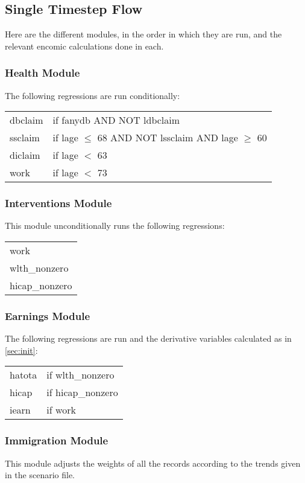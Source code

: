 \documentclass{article}
\begin{document}
\subsection{Single Timestep Flow}
Here are the different modules, in the order in which they are run,
and the relevant encomic calculations done in each.

\subsubsection{Health Module}
The following regressions are run conditionally:
\begin{tabular}{ll}
dbclaim &if fanydb AND NOT ldbclaim\\
ssclaim &if lage $\leq$ 68 AND NOT lssclaim AND
    lage $\geq$ 60\\
diclaim & if lage $<$ 63\\
work &if lage $<$ 73\\
\end{tabular}

\subsubsection{Interventions Module}
This module unconditionally runs the following regressions:
\begin{tabular}{l}
work\\
wlth\_nonzero\\
hicap\_nonzero\\
\end{tabular}

\subsubsection{Earnings Module}
The following regressions are run and the derivative variables
calculated as in \ref{sec:init}:
\begin{tabular}{ll}
hatota & if wlth\_nonzero\\
hicap & if hicap\_nonzero\\
iearn & if work\\
\end{tabular}

\subsubsection{Immigration Module}
This module adjusts the weights of all the records according to the
trends given in the scenario file.
\end{document}
